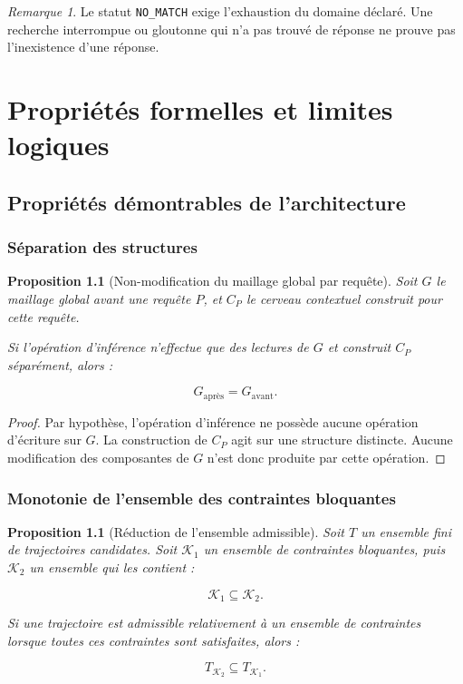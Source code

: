 \documentclass[11pt,a4paper,oneside]{book}
\newtheorem{proposition}[definition]{Proposition}
\theoremstyle{remark}
\newtheorem{remarque}[definition]{Remarque}
\begin{document}
\begin{remarque}
Le statut \texttt{NO\_MATCH} exige l'exhaustion du domaine déclaré.
Une recherche interrompue ou gloutonne qui n'a pas trouvé de réponse
ne prouve pas l'inexistence d'une réponse.
\end{remarque}


\part{Propriétés formelles et limites logiques}

\chapter{Propriétés démontrables de l'architecture}

\section{Séparation des structures}

\begin{proposition}[Non-modification du maillage global par requête]
Soit \(G\) le maillage global avant une requête \(P\), et \(C_P\)
le cerveau contextuel construit pour cette requête.

Si l'opération d'inférence n'effectue que des lectures de \(G\) et
construit \(C_P\) séparément, alors :

\[
G_{\mathrm{après}}=G_{\mathrm{avant}}.
\]

\end{proposition}

\begin{proof}
Par hypothèse, l'opération d'inférence ne possède aucune opération
d'écriture sur \(G\). La construction de \(C_P\) agit sur une
structure distincte. Aucune modification des composantes de \(G\)
n'est donc produite par cette opération.
\end{proof}

\section{Monotonie de l'ensemble des contraintes bloquantes}

\begin{proposition}[Réduction de l'ensemble admissible]
Soit \(T\) un ensemble fini de trajectoires candidates. Soit
\(\mathcal{K}_1\) un ensemble de contraintes bloquantes, puis
\(\mathcal{K}_2\) un ensemble qui les contient :

\[
\mathcal{K}_1\subseteq\mathcal{K}_2.
\]

Si une trajectoire est admissible relativement à un ensemble de
contraintes lorsque toutes ces contraintes sont satisfaites, alors :

\[
T_{\mathcal{K}_2}\subseteq T_{\mathcal{K}_1}.
\]

\end{proposition}
\end{document}
